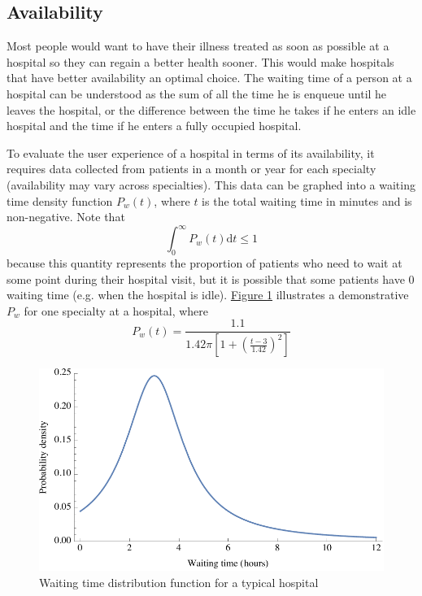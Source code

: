 \documentclass{article}
\begin{document}
\subsection{Availability}
Most people would want to have their illness treated as soon as possible at a hospital so they can regain a better health sooner. This would make hospitals that have better availability an optimal choice. The waiting time of a person at a hospital can be understood as the sum of all the time he is enqueue until he leaves the hospital, or the difference between the time he takes if he enters an idle hospital and the time if he enters a fully occupied hospital.

To evaluate the user experience of a hospital in terms of its availability, it requires data collected from patients in a month or year for each specialty (availability may vary across specialties). This data can be graphed into a waiting time density function $P_w\left(t\right)$, where $t$ is the total waiting time in minutes and is non-negative. Note that 
$$\int_0^\infty P_w\left(t\right) \mathrm{d}t \le 1$$
because this quantity represents the proportion of patients who need to wait at some point during their hospital visit, but it is possible that some patients have 0 waiting time (e.g. when the hospital is idle). \hyperref[fig:waiting_time_dist]{Figure \ref*{fig:waiting_time_dist}} illustrates a demonstrative $P_w$ for one specialty at a hospital, where $$P_w\left(t\right) = \frac{1.1}{1.42\pi \left[1 + \left( \frac{t -3}{1.42}\right)^2\right]}$$

\begin{figure}[!htbp]
    \centering
    \includegraphics[scale=0.68]{waiting_time_dist.pdf}
    \caption{Waiting time distribution function for a typical hospital}
    \label{fig:waiting_time_dist}
\end{figure}
\end{document}
